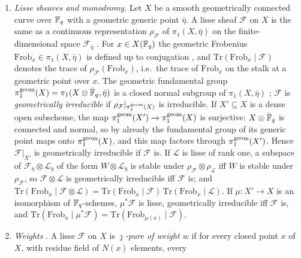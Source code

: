 \begin{enumerate}[label=\textup{(E\arabic*)},leftmargin=*]
\item\label{it:prelim:E1} \emph{Lisse sheaves and monodromy.} Let $X$ be a
  smooth geometrically connected curve over $\mathbb F_q$ with a geometric generic
  point $\bar\eta$. A lisse sheaf $\mathcal F$ on $X$ is the same as a
  continuous representation $\rho_{\mathcal F}$ of $\pi_1(X,\bar\eta)$ on the
  finite-dimensional space $\mathcal F_{\bar\eta}$
  \cite[(1.1.6)]{DeligneWeilII}. For $x\in X(\mathbb F_q)$ the geometric Frobenius
  $\mathrm{Frob}_x\in\pi_1(X,\bar\eta)$ is defined up to conjugation
  \cite[(1.1.7), (1.1.8)]{DeligneWeilII}, and
  $\mathrm{Tr}(\mathrm{Frob}_x\mid\mathcal F)$ denotes the trace of
  $\rho_{\mathcal F}(\mathrm{Frob}_x)$, i.e.\ the trace of $\mathrm{Frob}_x$
  on the stalk at a geometric point over $x$. The geometric fundamental group
  $\pi_1^{\rm geom}(X)=\pi_1(X\otimes\bar{\mathbb F}_q,\bar\eta)$ is a closed normal
  subgroup of $\pi_1(X,\bar\eta)$ \cite[(1.1.13), (1.1.15)]{DeligneWeilII};
  $\mathcal F$ is \emph{geometrically irreducible} if
  $\rho_{\mathcal F}|_{\pi_1^{\rm geom}(X)}$ is irreducible. If
  $X'\subseteq X$ is a dense open subscheme, the map
  $\pi_1^{\rm geom}(X')\to\pi_1^{\rm geom}(X)$ is surjective:
  $X\otimes\bar{\mathbb F}_q$ is connected and normal, so by
  \cite[Exp.~V, Prop.~8.2]{SGA1} already the fundamental group of its generic
  point maps onto $\pi_1^{\rm geom}(X)$, and this map factors through
  $\pi_1^{\rm geom}(X')$. Hence $\mathcal F|_{X'}$ is geometrically
  irreducible if $\mathcal F$ is. If $\mathcal L$ is lisse of rank one, a
  subspace of $\mathcal F_{\bar\eta}\otimes\mathcal L_{\bar\eta}$ of the form
  $W\otimes\mathcal L_{\bar\eta}$ is stable under
  $\rho_{\mathcal F}\otimes\rho_{\mathcal L}$ iff $W$ is stable under
  $\rho_{\mathcal F}$, so $\mathcal F\otimes\mathcal L$ is geometrically
  irreducible iff $\mathcal F$ is; and
  $\mathrm{Tr}(\mathrm{Frob}_x\mid\mathcal F\otimes\mathcal L)=
  \mathrm{Tr}(\mathrm{Frob}_x\mid\mathcal F)\,
  \mathrm{Tr}(\mathrm{Frob}_x\mid\mathcal L)$. If $\mu:X'\to X$ is an
  isomorphism of $\mathbb F_q$-schemes, $\mu^*\mathcal F$ is lisse, geometrically
  irreducible iff $\mathcal F$ is, and
  $\mathrm{Tr}(\mathrm{Frob}_x\mid\mu^*\mathcal F)=
  \mathrm{Tr}(\mathrm{Frob}_{\mu(x)}\mid\mathcal F)$.
\item\label{it:prelim:E2} \emph{Weights}
  \cite[(1.2.1), (1.2.2), (1.2.5), (1.2.6)]{DeligneWeilII}. A lisse
  $\mathcal F$ on $X$ is \emph{$\jmath$-pure of weight $w$} if for every
  closed point $x$ of $X$, with residue field of $N(x)$ elements, every

\end{enumerate}
